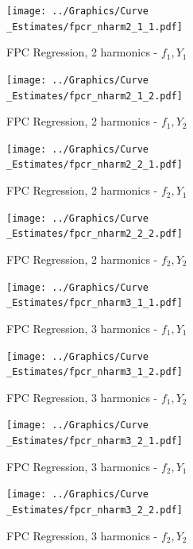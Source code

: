 \documentclass[11pt,twoside,a4paper]{article}
\begin{document}
	\begin{figure}[H]
		\centering
		\begin{minipage}{.5\textwidth}
			\centering
			\texttt{[image: ../Graphics/Curve\\\_Estimates/fpcr\_nharm2\_1\_1.pdf]}
			\caption{FPC Regression, 2 harmonics - $f_1, Y_1$}
		\end{minipage}%
		\begin{minipage}{.5\textwidth}
			\centering
			\texttt{[image: ../Graphics/Curve\\\_Estimates/fpcr\_nharm2\_1\_2.pdf]}
			\caption{FPC Regression, 2 harmonics - $f_1, Y_2$}
		\end{minipage}
	\end{figure}
	
	\begin{figure}[H]
		\centering
		\begin{minipage}{.5\textwidth}
			\centering
			\texttt{[image: ../Graphics/Curve\\\_Estimates/fpcr\_nharm2\_2\_1.pdf]}
			\caption{FPC Regression, 2 harmonics - $f_2, Y_1$}
		\end{minipage}%
		\begin{minipage}{.5\textwidth}
			\centering
			\texttt{[image: ../Graphics/Curve\\\_Estimates/fpcr\_nharm2\_2\_2.pdf]}
			\caption{FPC Regression, 2 harmonics - $f_2, Y_2$}
		\end{minipage}
	\end{figure}
	
	\begin{figure}[H]
		\centering
		\begin{minipage}{.5\textwidth}
			\centering
			\texttt{[image: ../Graphics/Curve\\\_Estimates/fpcr\_nharm3\_1\_1.pdf]}
			\caption{FPC Regression, 3 harmonics - $f_1, Y_1$}
		\end{minipage}%
		\begin{minipage}{.5\textwidth}
			\centering
			\texttt{[image: ../Graphics/Curve\\\_Estimates/fpcr\_nharm3\_1\_2.pdf]}
			\caption{FPC Regression, 3 harmonics - $f_1, Y_2$}
		\end{minipage}
	\end{figure}
	
	\begin{figure}[H]
		\centering
		\begin{minipage}{.5\textwidth}
			\centering
			\texttt{[image: ../Graphics/Curve\\\_Estimates/fpcr\_nharm3\_2\_1.pdf]}
			\caption{FPC Regression, 3 harmonics - $f_2, Y_1$}
		\end{minipage}%
		\begin{minipage}{.5\textwidth}
			\centering
			\texttt{[image: ../Graphics/Curve\\\_Estimates/fpcr\_nharm3\_2\_2.pdf]}
			\caption{FPC Regression, 3 harmonics - $f_2, Y_2$}
		\end{minipage}
	\end{figure}
	
\end{document}
